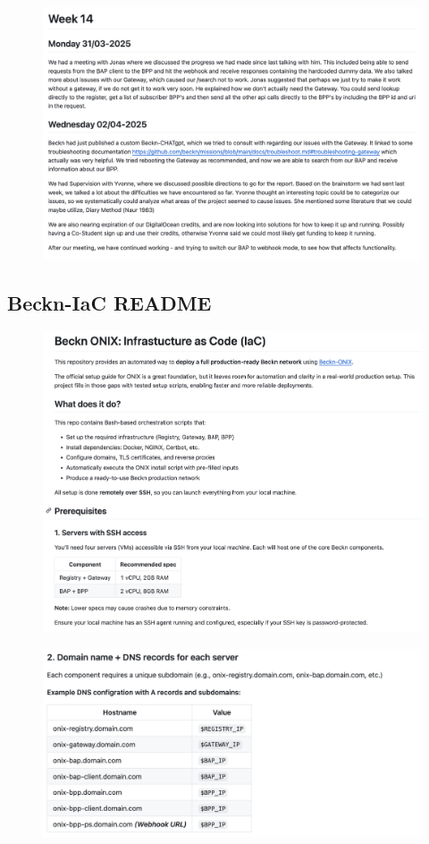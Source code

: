 \begin{figure}[H]
    \centering
    \includegraphics[width=\textwidth]{Images/week_14.png}
\end{figure}

\clearpage
\subsection{Beckn-IaC README} \label{readme_appendix}
\begin{figure}[h!]
    \centering
    \includegraphics[width=1\textwidth]{Images/readme_1.png}
\end{figure}
\begin{figure}[h!]
    \centering
    \includegraphics[width=1\textwidth]{Images/readme_2.png}
\end{figure}

